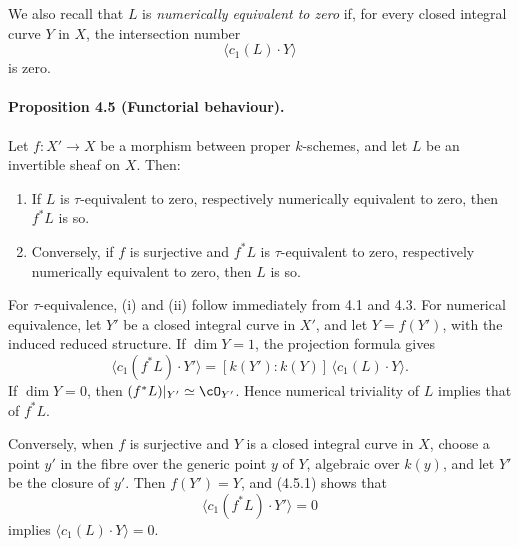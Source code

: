 \documentclass[11pt]{article}
\theoremstyle{plain}
\theoremstyle{definition}
\theoremstyle{remark}
\begin{document}
We also recall that $L$ is \emph{numerically equivalent to zero} if, for every closed integral curve $Y$ in $X$, the intersection number
\[
\langle c_1(L)\cdot Y\rangle
\]
is zero.

\paragraph{Proposition 4.5 (Functorial behaviour).}
Let $f:X'\to X$ be a morphism between proper $k$-schemes, and let $L$ be an invertible sheaf on $X$. Then:
\begin{enumerate}[label=\roman*)]
\item If $L$ is $\tau$-equivalent to zero, respectively numerically equivalent to zero, then $f^*L$ is so.
\item Conversely, if $f$ is surjective and $f^*L$ is $\tau$-equivalent to zero, respectively numerically equivalent to zero, then $L$ is so.
\end{enumerate}

For $\tau$-equivalence, (i) and (ii) follow immediately from 4.1 and 4.3. For numerical equivalence, let $Y'$ be a closed integral curve in $X'$, and let $Y=f(Y')$, with the induced reduced structure. If $\dim Y=1$, the projection formula gives
\[
\langle c_1(f^*L)\cdot Y'\rangle
   =[k(Y'):k(Y)]\,\langle c_1(L)\cdot Y\rangle.
\tag{4.5.1}
\]
If $\dim Y=0$, then $(f^*L)|_{Y'}\simeq\cO_{Y'}$. Hence numerical triviality of $L$ implies that of $f^*L$.

Conversely, when $f$ is surjective and $Y$ is a closed integral curve in $X$, choose a point $y'$ in the fibre over the generic point $y$ of $Y$, algebraic over $k(y)$, and let $Y'$ be the closure of $y'$. Then $f(Y')=Y$, and (4.5.1) shows that
\[
\langle c_1(f^*L)\cdot Y'\rangle=0
\]
implies $\langle c_1(L)\cdot Y\rangle=0$.
\end{document}
